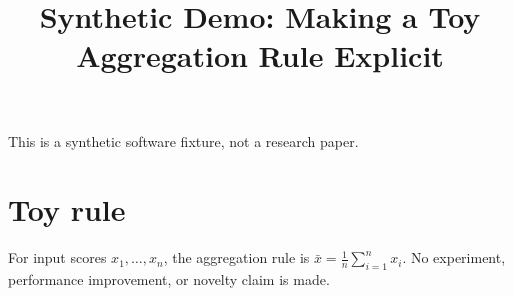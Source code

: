 \documentclass{article}
\begin{document}
\title{Synthetic Demo: Making a Toy Aggregation Rule Explicit}
\maketitle
This is a synthetic software fixture, not a research paper.
\section{Toy rule}\label{sec:rule}
For input scores $x_1,\ldots,x_n$, the aggregation rule is
$\bar{x}=\frac{1}{n}\sum_{i=1}^{n}x_i$.
No experiment, performance improvement, or novelty claim is made.
\end{document}
